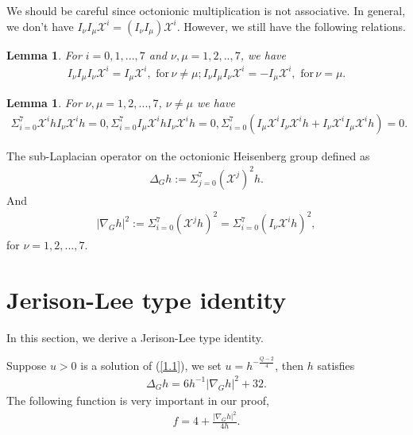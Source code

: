 \documentclass[10pt,a4paper]{amsart}
\numberwithin{equation}{section}
\newtheorem{lemma}[theorem]{Lemma}
\begin{document}
We should be careful since octonionic multiplication is not associative. In general, we don't have $I_\nu I_\mu\mathscr{X}^i=(I_\nu I_\mu)\mathscr{X}^i$. However, we still have the following relations.
\begin{lemma}\label{lemma2.2}
For $i=0,1,...,7$ and $\nu,\mu=1,2,..,7$, we have
    \begin{equation*}
        \begin{aligned}
            I_\nu I_\mu I_\nu \mathscr{X}^i=I_\mu \mathscr{X}^i,\,\,\textrm{for}\,\nu\neq \mu;I_\nu I_\mu I_\nu \mathscr{X}^i=-I_\mu \mathscr{X}^i,\,\,\textrm{for}\,\nu= \mu.        \end{aligned}
    \end{equation*}
\end{lemma}
\begin{lemma}\label{lemma2.3}
    For $\nu,\mu=1,2,...,7$, $\nu\neq \mu$ we have
    \begin{align*}
        \Sigma_{i=0}^7\mathscr{X}^i h I_\nu\mathscr{X}^i h=0,\Sigma_{i=0}^7 I_\mu \mathscr{X}^ih I_\nu\mathscr{X}^i h=0,\Sigma_{i=0}^7 (I_\mu \mathscr{X}^i I_\nu\mathscr{X}^i h+I_\nu\mathscr{X}^iI_\mu\mathscr{X}^ih)=0.    \end{align*}
\end{lemma}


The sub-Laplacian operator on the octonionic Heisenberg group defined as
\begin{align*}
    \Delta_G h:=\Sigma_{j=0}^7(\mathscr{X}^j)^2h.
\end{align*}
And 
\begin{align*}
    |\nabla_G h|^2:=\Sigma_{i=0}^7(\mathscr{X}^j h)^2=\Sigma_{i=0}^7(I_\nu\mathscr{X}^i h)^2,
    \end{align*}
for $\nu=1,2,...,7.$



    
\section{Jerison-Lee type identity }\label{s3} 
In this section, we derive a Jerison-Lee type identity.


Suppose $u>0$ is a solution of (\ref{1.1}), we set  $u=h^{-\frac{Q-2}{4}}$, then $h$ satisfies
\begin{align}\label{3.1}
    \Delta_G h=6h^{-1}|\nabla_G h|^2+32.
\end{align}
The following function is very important in our proof,
\begin{align}\label{3.2}
    f=4+\frac{|\nabla_G h|^2}{4h}.
    \end{align}
\end{document}
